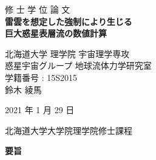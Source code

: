 \documentclass[a4j,12pt,openbib,oneside]{jreport}
\begin{document}
\begin{titlepage}
 \centering
 \vspace*{40truept}
 {\Huge 修 \hspace{10pt} 士 \hspace{10pt} 学 \hspace{10pt} 位
 \hspace{10pt} 論 \hspace{10pt} 文}\\  %
 \vspace*{50truept}
 \textbf{{\Huge 雷雲を想定した強制により生じる\\
巨大惑星表層流の数値計算}} \\ %
 \vspace{30truept}
 \vspace{150truept}
 \begin{center}
  {\Large 北海道大学 理学院 宇宙理学専攻}
  \vspace{10truept}\\
  {\Large 惑星宇宙グループ 地球流体力学研究室}
  \vspace{10truept}\\
  {\Large 学籍番号 : 15S2015} 
  \vspace{30truept}\\
  {\LARGE 鈴木 綾馬}
  \vspace{10truept}
 \end{center}
 \begin{center}
  {\Large 2021 年 1 月 29 日}
 \end{center}
 \vspace{50truept}
 {\Large 北海道大学大学院理学院修士課程} \\
\end{titlepage}


\thispagestyle{empty}
\setcounter{page}{0}

%
\clearpage
\begin{center}
\large{\bf 要旨}
\end{center}
\thispagestyle{empty}

%
%
\clearpage
\thispagestyle{empty}
\setcounter{page}{0}
\setcounter{tocdepth}{3}
\tableofcontents 
\thispagestyle{empty}
\setcounter{page}{0}
\end{document}

